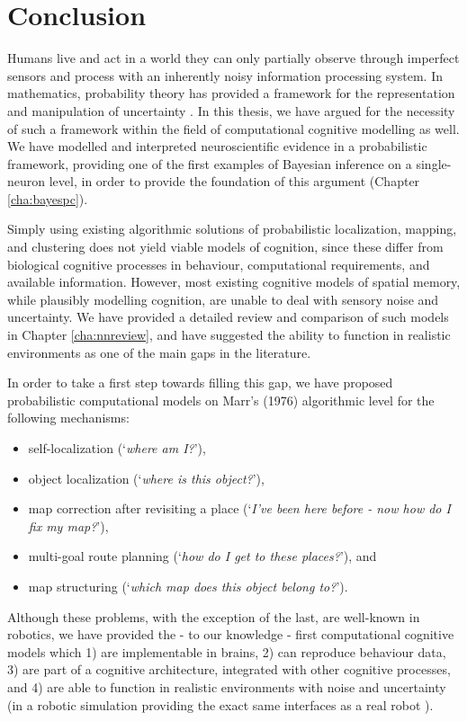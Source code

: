 \chapter{Conclusion}
\label{cha:conclusion}

Humans live and act in a world they can only partially observe through imperfect sensors and process with an inherently noisy information processing system. In mathematics, probability theory has provided a framework for the representation and manipulation of uncertainty \citep{jaynes1996probability}. In this thesis, we have argued for the necessity of such a framework within the field of computational cognitive modelling as well. We have modelled and interpreted neuroscientific evidence in a probabilistic framework, providing one of the first examples of Bayesian inference on a single-neuron level, in order to provide the foundation of this argument (Chapter \ref{cha:bayespc}). 

Simply using existing algorithmic solutions of probabilistic localization, mapping, and clustering does not yield viable models of cognition, since these differ from biological cognitive processes in behaviour, computational requirements, and available information. However, most existing cognitive models of spatial memory, while plausibly modelling cognition, are unable to deal with sensory noise and uncertainty. We have provided a detailed review and comparison of such models in Chapter \ref{cha:nnreview}, and have suggested the ability to function in realistic environments as one of the main gaps in the literature.

In order to take a first step towards filling this gap, we have proposed probabilistic computational models on Marr's (1976) algorithmic level for the following mechanisms:

\begin{itemize}
	\item self-localization (`\textit{where am I?}'),
	\item object localization (`\textit{where is this object?}'),
	\item map correction after revisiting a place (`\textit{I've been here before - now how do I fix my map?}'), 
	\item multi-goal route planning (`\textit{how do I get to these places?}'), and
	\item map structuring (`\textit{which map does this object belong to?}').
\end{itemize}

Although these problems, with the exception of the last, are well-known in robotics, we have provided the - to our knowledge - first computational cognitive models which 1) are implementable in brains, 2) can reproduce behaviour data, 3) are part of a cognitive architecture, integrated with other cognitive processes, and 4) are able to function in realistic environments with noise and uncertainty (in a robotic simulation providing the exact same interfaces as a real robot \citep{rusu2007extending}). 

